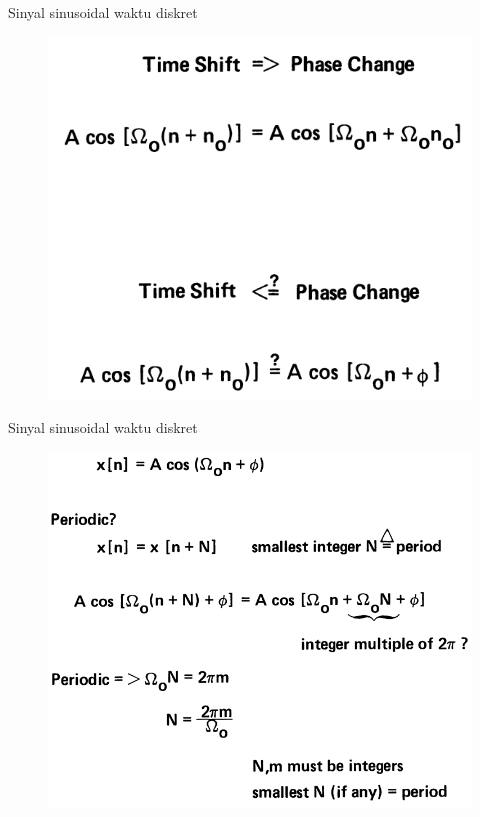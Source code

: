 \documentclass[pdflatex,compress,mathserif]{beamer}
\begin{document}
\begin{frame}{Sinyal sinusoidal waktu diskret}
	\begin{figure}
		\centering
		\includegraphics[height=0.8\textheight]{img/01.slide_09}
	\end{figure}
\end{frame}

\begin{frame}{Sinyal sinusoidal waktu diskret}
	\begin{figure}
		\centering
		\includegraphics[height=0.8\textheight]{img/01.slide_10}
	\end{figure}
\end{frame}
\end{document}
